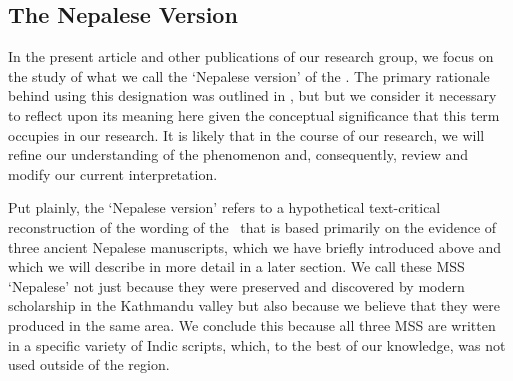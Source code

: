 \subsection{The Nepalese Version}

In the present article and other publications of our research group, we focus on the study of what we call the `Nepalese version' of the \SS. The primary rationale behind using this designation was outlined in \citet[2-3]{kleb-2021b}, but but we consider it necessary to reflect upon its meaning here given the conceptual significance that this term occupies in our research.
It is likely that in the course of our research, we will refine our understanding of the phenomenon and, consequently, review and modify our current interpretation.%

Put plainly, the `Nepalese version' refers to a hypothetical text-critical reconstruction of the wording of the \SS\ that is based primarily on the evidence of three ancient Nepalese manuscripts, which we have briefly introduced above and which we will describe in more detail in a later section.  We call these MSS `Nepalese' not just because they were preserved and discovered by modern scholarship 
in the 
Kathmandu valley
but also because we believe that they were produced in the same area. We conclude this because all three MSS are written in a specific variety of Indic scripts, which, to the best of our knowledge, was not used outside of the region. 

